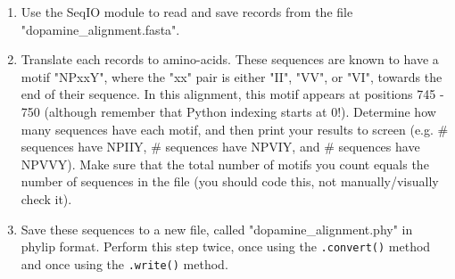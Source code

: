 \documentclass{article}[12pt]
\newcommand{\code}[1]{\texttt{#1}}  %
\begin{document}
\begin{enumerate}[itemsep=5ex]
	\begin{enumerate}[itemsep=2ex]
		\item Use the SeqIO module to read and save records from the file "dopamine\_alignment.fasta".
		\item Translate each records to amino-acids. These sequences are known to have a motif "NPxxY", where the "xx" pair is either "II", "VV", or "VI", towards the end of their sequence. In this alignment, this motif appears at positions 745 - 750 (although remember that Python indexing starts at 0!). Determine how many sequences have each motif, and then print your results to screen (e.g. \# sequences have NPIIY, \# sequences have NPVIY, and \# sequences have NPVVY). Make sure that the total number of motifs you count equals the number of sequences in the file (you should code this, not manually/visually check it).
		\item Save these sequences to a new file, called "dopamine\_alignment.phy" in phylip format. Perform this step twice, once using the \code{.convert()} method and once using the \code{.write()} method.
			
		\end{enumerate}
	
\end{enumerate}	
	







\end{document}
